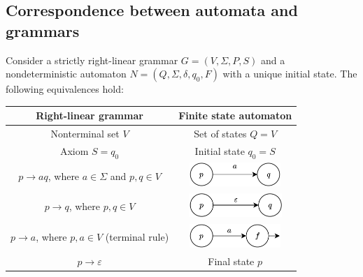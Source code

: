 \subsection{Correspondence between automata and grammars}
Consider a strictly right-linear grammar $G=(V,\Sigma,P,S)$ and a nondeterministic automaton $N=(Q,\Sigma,\delta,q_0,F)$ with a unique initial state.
The following equivalences hold:
\begin{table}[H]
    \centering
    \begin{tabular}{cc}
    \hline
    \textbf{Right-linear grammar}                            & \textbf{Finite state automaton} \\ \hline
    Nonterminal set $V$                                      & Set of states $Q=V$             \\
    Axiom $S=q_0$                                            & Initial state $q_0=S$           \\
    $p \rightarrow aq$, where $a \in \Sigma$ and $p,q \in V$ & \begin{minipage}{.2\textwidth}\centering\includegraphics[width=\linewidth, height=9mm]{images/a.png}\end{minipage}                                \\
    $p \rightarrow q$, where $p,q \in V$                     & \begin{minipage}{.2\textwidth}\centering\includegraphics[width=\linewidth, height=9mm]{images/b.png}\end{minipage}                                 \\
    $p \rightarrow a$, where $p,a \in V$ (terminal rule)     & \begin{minipage}{.2\textwidth}\centering\includegraphics[width=\linewidth, height=9mm]{images/c.png}\end{minipage}                                 \\
    $p \rightarrow \varepsilon$                              & Final state $p$                 \\ \hline
    \end{tabular}
\end{table}

